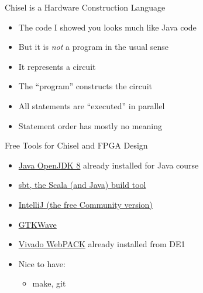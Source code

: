\begin{frame}[fragile]{Chisel is a Hardware Construction Language}
\begin{itemize}
\item The code I showed you looks much like Java code
\item But it is \emph{not} a program in the usual sense
\item It represents a circuit
\item The ``program'' constructs the circuit
\item All statements are ``executed'' in parallel
\item Statement order has mostly no meaning
\end{itemize}
\end{frame}

\begin{frame}[fragile]{Free Tools for Chisel and FPGA Design}
\begin{itemize}
\item \href{https://adoptopenjdk.net/}{Java OpenJDK 8} already installed for Java course
\item \href{https://www.scala-sbt.org/}{sbt, the Scala (and Java) build tool}
\item \href{https://www.jetbrains.com/idea/download/}{IntelliJ (the free Community version)}
\item \href{http://gtkwave.sourceforge.net/}{GTKWave}
\item \href{https://www.xilinx.com/products/design-tools/vivado/vivado-webpack.html}{Vivado WebPACK} already installed from DE1
\item Nice to have:
\begin{itemize}
\item make, git
\end{itemize}
\end{itemize}
\end{frame}

